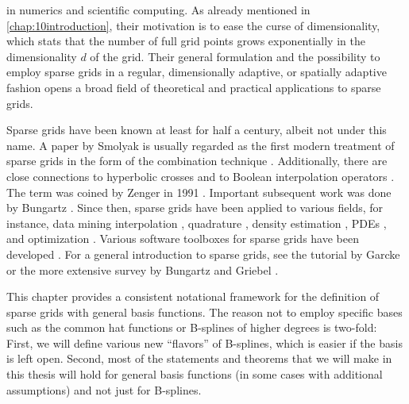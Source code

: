 
\label{chap:20sparseGrids}

in numerics and scientific computing.
As already mentioned in \cref{chap:10introduction},
their motivation is to ease the curse of dimensionality,
which stats that the number of full grid points
grows exponentially in the dimensionality $d$ of the grid.
Their general formulation and the possibility to employ sparse grids in a
regular, dimensionally adaptive, or spatially adaptive fashion
opens a broad field of theoretical and practical applications
to sparse grids.

Sparse grids have been known at least for half a century,
albeit not under this name.
A paper by Smolyak \cite{Smolyak63Quadrature} is usually regarded
as the first modern treatment of sparse grids in the form
of the combination technique \cite{Garcke13Sparse}.
Additionally, there are close connections to
hyperbolic crosses \cite{Temljakov82Approximation}
and to Boolean interpolation operators
.
The term  was coined by Zenger in 1991
\cite{Zenger91Sparse}.
Important subsequent work was done by Bungartz
.
Since then, sparse grids have been applied to various fields,
for instance,
data mining
interpolation
\cite{Sickel11Spline},
quadrature
\cite{Gerstner98Numerical},
density estimation
,
PDEs
, and
optimization
.
Various software toolboxes for sparse grids have been developed
.
For a general introduction to sparse grids,
see the tutorial by Garcke \cite{Garcke13Sparse} or
the more extensive survey by Bungartz and Griebel
\cite{Bungartz04Sparse}.

This chapter provides a consistent notational framework
for the definition of sparse grids with general basis functions.
The reason not to employ specific bases such as the common hat functions
or B-splines of higher degrees is two-fold:
First, we will define various new ``flavors'' of B-splines,
which is easier if the basis is left open.
Second, most of the statements and theorems that we will make in this
thesis will hold for general basis functions
(in some cases with additional assumptions)
and not just for B-splines.

